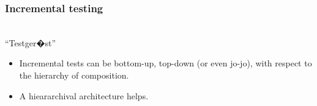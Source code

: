 
\begin{frame}
\frametitle{Incremental testing}
\begin{center}
\\
"`Testger�st"'
\end{center}
 
\begin{itemize}
	\item Incremental tests can be bottom-up, top-down (or even jo-jo), with respect to the hierarchy of composition.
	\item A hieararchival architecture helps.
\end{itemize}
\end{frame}
